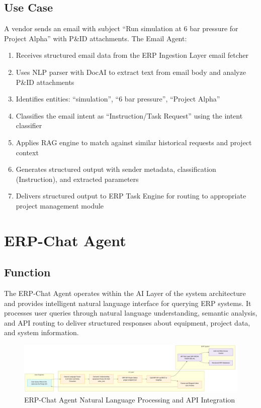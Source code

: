 \documentclass[12pt]{report}
\begin{document}
\section{Use Case}
A vendor sends an email with subject ``Run simulation at 6 bar pressure for Project Alpha'' with P\&ID attachments. The Email Agent:
\begin{enumerate}
  \item Receives structured email data from the ERP Ingestion Layer email fetcher
  \item Uses NLP parser with DocAI to extract text from email body and analyze P\&ID attachments
  \item Identifies entities: ``simulation'', ``6 bar pressure'', ``Project Alpha''
  \item Classifies the email intent as ``Instruction/Task Request'' using the intent classifier
  \item Applies RAG engine to match against similar historical requests and project context
  \item Generates structured output with sender metadata, classification (Instruction), and extracted parameters
  \item Delivers structured output to ERP Task Engine for routing to appropriate project management module
\end{enumerate}

\chapter{ERP-Chat Agent}
\section{Function}
The ERP-Chat Agent operates within the AI Layer of the system architecture and provides intelligent natural language interface for querying ERP systems. It processes user queries through natural language understanding, semantic analysis, and API routing to deliver structured responses about equipment, project data, and system information.

\begin{figure}[htbp]
\centering
\includegraphics[width=\textwidth,height=0.8\textheight,keepaspectratio]{../../pics/erp-chat.png}
\caption{ERP-Chat Agent Natural Language Processing and API Integration}
\label{fig:erp-chat-workflow}
\end{figure}
\end{document}
